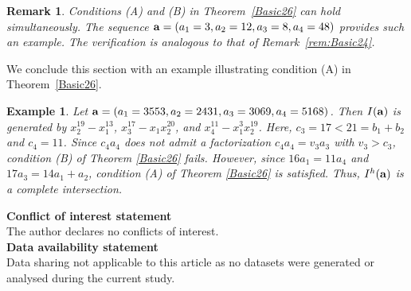 \documentclass[10pt,a4paper]{amsart}
\newtheorem{rem1}[thm1]{Remark}
\newtheorem{ex1}[thm1]{Example}
\begin{document}
\begin{rem1} {\rm Conditions {\rm (A)} and {\rm (B)} in Theorem~\ref{Basic26} can hold simultaneously. The sequence
${\bf a}=(a_1=3, a_2=12, a_3=8, a_4=48)$
provides such an example. The verification is analogous to that of Remark~\ref{rem:Basic24}.}
\end{rem1}

We conclude this section with an example illustrating condition {\rm (A)} in Theorem~\ref{Basic26}.

\begin{ex1} {\rm Let ${\bf a}=(a_{1}=3553,a_2=2431,a_3=3069,a_{4}=5168)$. Then $I({\bf a})$ is generated by $x_{2}^{19}-x_{1}^{13}$, $x_{3}^{17}-x_{1}x_{2}^{20}$, and $x_{4}^{11}-x_{1}^{3}x_{2}^{19}$. Here, $c_3=17<21=b_1+b_2$ and $c_4=11$. Since $c_4a_4$ does not admit a factorization $c_4a_4=v_3a_3$ with $v_3>c_3$, condition (B) of Theorem \ref{Basic26} fails. However, since $16a_1=11a_4$ and $17a_3=14a_1+a_2$, condition (A) of Theorem \ref{Basic26} is satisfied. Thus, $I^{h}({\bf a})$ is a complete intersection.}
\end{ex1}

\noindent \textbf{Conflict of interest statement}\\  The author declares no conflicts of interest.\\

\noindent \textbf{Data availability statement}\\Data sharing not applicable to this article as no datasets were generated or analysed during the current study.
\end{document}
